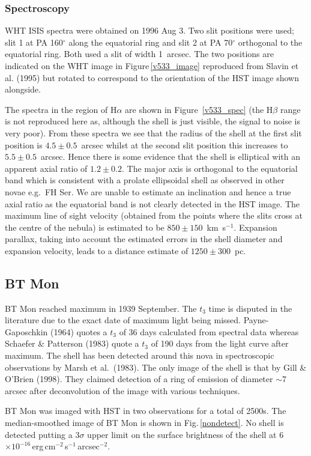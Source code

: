 \subsubsection{Spectroscopy}
WHT ISIS spectra were obtained on 1996 Aug 3. 
Two slit positions were used; slit 1 at PA
160$^\circ$ along the equatorial ring and slit 2 at PA 70$^\circ$
orthogonal to the equatorial ring. Both used  a slit
of width 1~arcsec. The two positions are 
indicated on the WHT image in Figure\,\ref{v533_image} reproduced from
Slavin et al. (1995) but rotated to correspond to the orientation of the
HST image shown alongside. 

The spectra in the region of H$\alpha$ are shown in
Figure~\ref{v533_spec} (the H$\beta$ range is not reproduced here as,
although the shell is just visible, the signal to noise is very poor).
From these spectra we see that the radius of the shell at the first slit
position is $4.5\pm0.5$~arcsec whilst at the second slit position this
increases to $5.5\pm0.5$~arcsec. Hence there is some evidence that the shell
is elliptical with an apparent axial ratio of $1.2\pm0.2$. The major
axis is orthogonal to the equatorial band which is consistent with a
prolate ellipsoidal shell as observed in other novae e.g.\ FH Ser. 
We are unable to
estimate an inclination and hence a true axial ratio as the equatorial
band is not clearly detected in the HST image. The maximum line of sight
velocity (obtained from the points where the slits cross at the centre of
the nebula) is estimated to be $850\pm150$~km~s$^{-1}$. Expansion
parallax, taking into account the estimated errors in the shell diameter
and expansion velocity, leads to a distance estimate of $1250\pm300$~pc.


\subsection{BT Mon}
BT Mon reached maximum in 1939 September. The $t_3$ time is disputed in
the literature due to the exact date of maximum light being missed.
Payne-Gaposchkin (1964) quotes a $t_3$ of 36 days calculated from
spectral data whereas Schaefer \& Patterson (1983) quote a $t_3$ of 190
days from the light curve after maximum. The shell has been detected
around this nova in spectroscopic observations by Marsh et al.\ (1983).
The only image of the shell is that by Gill \& O'Brien (1998). 
They claimed detection of a ring of emission of diameter $\sim$7 arcsec
after deconvolution of the image with various techniques.

BT Mon was imaged with HST in two observations for a total of 2500s. The
median-smoothed image of BT Mon is shown in
Fig.\,\ref{nondetect}. No shell is detected putting a 3$\sigma$ upper 
limit on the surface brightness of the shell at 
6$\times 10^{-16}$\,erg\,cm$^{-2}$\,s$^{-1}$\,arcsec$^{-2}$.


